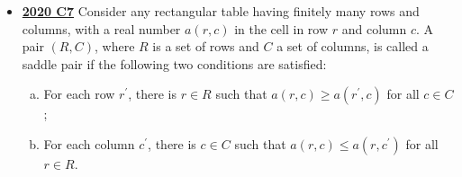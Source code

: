 \documentclass[11pt]{scrartcl}
\begin{document}
\begin{itemize}[leftmargin=*]
Some cells can be sticky, and the frog gets trapped once it hops on such a cell. A set $X$ of cells is called blocking if the frog cannot reach $F$ from $S$ when all the cells of $X$ are sticky. A blocking set is minimal if it does not contain a smaller blocking set.
\begin{enumerate}[(a)]
    \item Prove that there exists a minimal blocking set containing at least $3m^2-3m$ cells.
    \item Prove that every minimal blocking set containing at most $3m^2$ cells.
\end{enumerate}
    \item \href{https://artofproblemsolving.com/community/c6h2625884p22698238}{\textbf{2020 C7}} Consider any rectangular table having finitely many rows and columns, with a real number $a(r, c)$ in the cell in row $r$ and column $c$. A pair $(R, C)$, where $R$ is a set of rows and $C$ a set of columns, is called a saddle pair if the following two conditions are satisfied:
    \begin{enumerate}[(a)]
        \item  For each row $r^{\prime}$, there is $r \in R$ such that $a(r, c) \geqslant  a\left(r^{\prime}, c\right)$ for all $c \in C$;
\item  For each column $c^{\prime}$, there is $c \in C$ such that $a(r, c) \leqslant a\left(r, c^{\prime}\right)$ for all $r \in R$.
    \end{enumerate}


\end{itemize}
\end{document}

